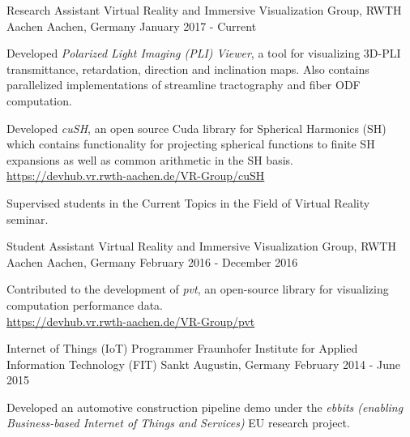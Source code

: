 \begin{cventries}
  \cventry
    {Research Assistant}
    {Virtual Reality and Immersive Visualization Group, RWTH Aachen}
    {Aachen, Germany}
    {January 2017 - Current}
    {
      \begin{cvitems}
        \item {Developed \textit{Polarized Light Imaging (PLI) Viewer}, a tool for visualizing 3D-PLI transmittance, retardation, direction and inclination maps. Also contains parallelized implementations of streamline tractography and fiber ODF computation.}
        \item {Developed \textit{cuSH}, an open source Cuda library for Spherical Harmonics (SH) which contains functionality for projecting spherical functions to finite SH expansions as well as common arithmetic in the SH basis. \\\href{https://devhub.vr.rwth-aachen.de/VR-Group/cuSH}{https://devhub.vr.rwth-aachen.de/VR-Group/cuSH}}
        \item {Supervised students in the Current Topics in the Field of Virtual Reality seminar.}
      \end{cvitems}
    }
  \cventry
    {Student Assistant}
    {Virtual Reality and Immersive Visualization Group, RWTH Aachen}
    {Aachen, Germany}
    {February 2016 - December 2016}
    {
      \begin{cvitems}
        \item {Contributed to the development of \textit{pvt}, an open-source library for visualizing computation performance data.\\\href{https://devhub.vr.rwth-aachen.de/VR-Group/pvt}{https://devhub.vr.rwth-aachen.de/VR-Group/pvt}}
      \end{cvitems}
    }
  \cventry
    {Internet of Things (IoT) Programmer}
    {Fraunhofer Institute for Applied Information Technology (FIT)}
    {Sankt Augustin, Germany}
    {February 2014 - June 2015}
    {
      \begin{cvitems}
        \item {Developed an automotive construction pipeline demo under the \textit{ebbits (enabling Business-based Internet of Things and Services)} EU research project.}

\end{cvitems}}
\end{cventries}
